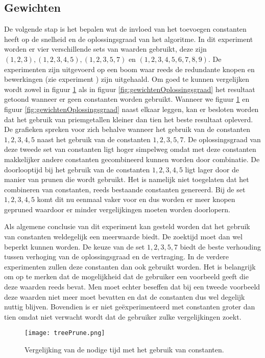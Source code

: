 \documentclass[Main.tex]{subfiles}
\begin{document}
\subsection{Gewichten}
De volgende stap is het bepalen wat de invloed van het toevoegen constanten heeft op de snelheid en de oplossingsgraad van het algoritme. In dit experiment worden er vier verschillende sets van waarden gebruikt, deze zijn $(1,2,3), (1,2,3,4,5), (1,2,3,5,7)$ en $(1,2,3,4,5,6,7,8,9)$. De experimenten zijn uitgevoerd op een boom waar reeds de redundante knopen en bewerkingen (zie experiment %
) zijn uitgehaald. Om goed te kunnen vergelijken wordt zowel in figuur \ref{fig:gewichtenTijd} als in figuur \ref{fig:gewichtenOplossingsgraad} het resultaat getoond wanneer er geen constanten worden gebruikt. Wanneer we figuur \ref{fig:gewichtenTijd} en figuur \ref{fig:gewichtenOplossingsgraad} naast elkaar leggen, kan er besloten worden dat het gebruik van priemgetallen kleiner dan tien het beste resultaat opleverd. De grafieken spreken voor zich behalve wanneer het gebruik van de constanten $1, 2, 3, 4, 5$  naast het gebruik van de constanten $1, 2, 3, 5, 7$. De oplossingsgraad van deze tweede set van constanten ligt hoger simpelweg omdat met deze constanten makkelijker andere constanten gecombineerd kunnen worden door combinatie. De doorlooptijd bij het gebruik van de constanten $1, 2, 3, 4, 5$ ligt lager door de manier van prunen die wordt gebruikt. Het is namelijk niet toegelaten dat het combineren van constanten, reeds bestaande constanten genereerd. Bij de set $1, 2, 3, 4, 5$ komt dit nu eenmaal vaker voor en dus worden er meer knopen gepruned waardoor er minder vergelijkingen moeten worden doorlopern.\par
Als algemene conclusie van dit experiment kan gesteld worden dat het gebruik van constanten weldegelijk een meerwaarde biedt. De zoektijd moet dan wel beperkt kunnen worden. De keuze van de set $1, 2, 3, 5, 7$ biedt de beste verhouding tussen verhoging van de oplossingsgraad en de vertraging. In de verdere experimenten zullen deze constanten dan ook gebruikt worden. Het is belangrijk om op te merken dat de mogelijkheid dat de gebruiker een voorbeeld geeft die deze waarden reeds bevat. Men moet echter beseffen dat bij een tweede voorbeeld deze waarden niet meer moet bevatten en dat de constanten dus wel degelijk nuttig blijven. Bovendien is er niet ge\"experimenteerd met constanten groter dan tien omdat niet verwacht wordt dat de gebruiker zulke vergelijkingen zoekt.

\begin{figure}
\centering
\texttt{[image: treePrune.png]} %
\caption{Vergelijking van de nodige tijd met het gebruik van constanten.} \label{fig:gewichtenTijd}
\end{figure}
\end{document}
